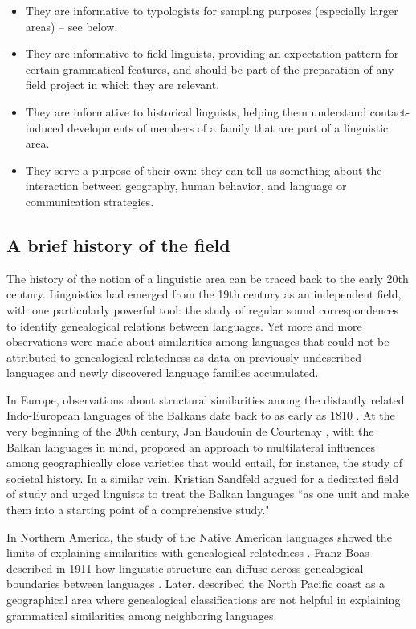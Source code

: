 \documentclass[output=paper]{langscibook}
\begin{document}
\begin{itemize}\sloppy
\item They are informative to typologists for sampling purposes (especially larger areas) -- see below.
\item They are informative to field linguists, providing an expectation pattern for certain grammatical features, and should be part of the preparation of any field project in which they are relevant.
\item They are informative to historical linguists, helping them understand contact-induced developments of members of a family that are part of a linguistic area.
\item They serve a purpose of their own: they can tell us something about the interaction between geography, human behavior, and language or communication strategies.
\end{itemize}

\subsection{A brief history of the field}
\label{subsec:history}

The history of the notion of a linguistic area can be traced back to the early 20th century. Linguistics had emerged from the 19th century as an independent field, with one particularly powerful tool: the study of regular sound correspondences to identify genealogical relations between languages. Yet more and more observations were made about similarities among languages that could not be attributed to genealogical relatedness as data on previously undescribed languages and newly discovered language families accumulated.

In Europe, observations about structural similarities among the distantly related Indo-European languages of the Balkans date back to as early as 1810 \parencite[177]{friedman11}. At the very beginning of the 20th century, Jan Baudouin de Courtenay \parencite{boduen-de-kurtene1901}, with the Balkan languages in mind, proposed an approach to multilateral influences among geographically close varieties that would entail, for instance, the study of societal history. In a similar vein, Kristian Sandfeld \parencite*[8]{sandfeld26} argued for a dedicated field of study and urged linguists to treat the Balkan languages ``as one unit and make them into a starting point of a comprehensive study."

In Northern America, the study of the Native American languages showed the limits of explaining similarities with genealogical relatedness \parencite[see e.g.][881--882]{mithun2017native}. Franz Boas described in 1911 how linguistic structure can diffuse across genealogical boundaries between languages \parencite[47--53]{boas11}. Later, \textcite[6]{boas29} described the North Pacific coast as a geographical area where genealogical classifications are not helpful in explaining grammatical similarities among neighboring languages.
\end{document}
